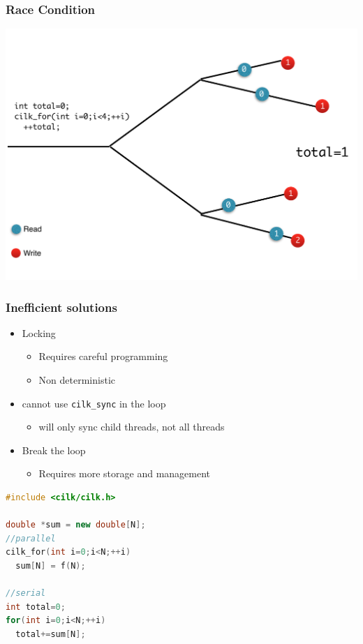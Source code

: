 \documentclass[fleqn,xcolor=table,10pt,final]{beamer}
\begin{document}
\begin{frame}
  \frametitle{Race Condition}
  \includegraphics[width=\textwidth]{figures/race}
\end{frame}

\begin{frame}[fragile]
  \frametitle{Inefficient solutions}
  \begin{itemize}
    \itemsep 0.4cm
    \item Locking
      \begin{itemize}
        \item Requires careful programming
        \item Non deterministic
      \end{itemize}
    \item cannot use {\tt cilk\_sync} in the loop
      \begin{itemize}
        \item will only sync child threads, not all threads
      \end{itemize}
    \item Break the loop
      \begin{itemize}
        \item Requires more storage and management
      \end{itemize}
  \end{itemize}
  \begin{lstlisting}[language=C++,basicstyle=\scriptsize]
#include <cilk/cilk.h>

double *sum = new double[N];
//parallel
cilk_for(int i=0;i<N;++i)
  sum[N] = f(N);

//serial
int total=0;
for(int i=0;i<N;++i)
  total+=sum[N];
  \end{lstlisting}
\end{frame}
\end{document}
